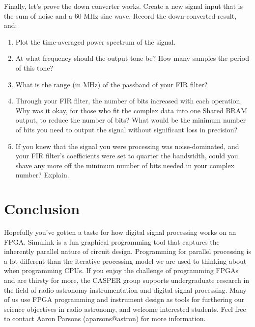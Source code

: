 \documentclass[11pt]{article}
\begin{document}
Finally, let's prove the down converter works.  Create a new signal input that is the sum of noise and a 60 MHz sine wave.
Record the down-converted result, and:
\begin{enumerate}
\item Plot the time-averaged power spectrum of the signal.
\item At what frequency should the output tone be?  How many samples the period of this tone?
\item What is the range (in MHz) of the passband of your FIR filter?
\item Through your FIR filter, the number of bits increased with each operation.  Why was it okay, for those who
fit the complex data into one Shared BRAM output, to reduce the number of bits?  What would be the minimum number of
bits you need to output the signal without significant loss in precision?
\item If you knew that the signal you were processing was noise-dominated, and your FIR filter's coefficients were
set to quarter the bandwidth, could you shave any more off the minimum number of bits needed in your complex number?
Explain.
\end{enumerate}

\section{Conclusion}

Hopefully you've gotten a taste for how digital signal processing works on an FPGA.  Simulink is a fun graphical
programming tool that captures the inherently parallel nature of circuit design.  Programming for parallel processing
is a lot different than the iterative processing model we are used to thinking about when programming CPUs.  If
you enjoy the challenge of programming FPGAs and are thirsty for more, the CASPER group supports undergraduate
research in the field of radio astronomy instrumentation and digital signal processing.  Many of 
us use FPGA programming and instrument design as tools for furthering our science objectives in 
radio astronomy, and welcome interested students.  Feel free to contact Aaron Parsons (aparsons@astron) for more
information.
\end{document}
